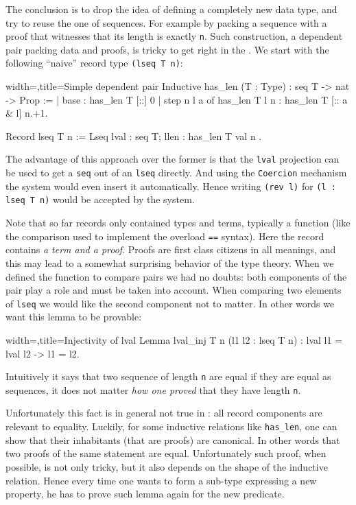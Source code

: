 The conclusion is to drop the idea of defining a completely new data
type, and try to reuse the one of sequences.  For example by packing a
sequence with a proof that witnesses that its length is exactly
\lstinline/n/.  Such construction, a dependent pair packing data
and proofs, is tricky to get right in the \mcbCIC{}.  We start with
the following ``naive'' record type \lstinline/(lseq T n)/:

\begin{coq}{width=\textwidth,title=Simple dependent pair}
Inductive has_len (T : Type) : seq T -> nat -> Prop :=
| base : has_len T [::] 0
| step n l a of has_len T l n : has_len T [:: a & l] n.+1.

Record lseq T n := Lseq { lval : seq T; llen : has_len T val n }.
\end{coq}

The advantage of this approach over the former is that the
\lstinline/lval/ projection can be used to get a \lstinline/seq/ out
of an \lstinline/lseq/ directly.  And using the \lstinline/Coercion/
mechanism the system would even insert it automatically.  Hence
writing \lstinline/(rev l)/ for \lstinline/(l : lseq T n)/ would
be accepted by the system.

Note that so far records only contained types and terms, typically
a function (like the comparison used to implement the overload
\lstinline/==/ syntax).  Here the record contains \emph{a term and a proof}.
Proofs are first class citizens in all meanings, and this may lead to
a somewhat surprising behavior of the type theory.
When we defined the function to compare pairs we had no
doubts: both components of the pair play a role and must be taken into
account.  When comparing two elements of \lstinline/lseq/ we would
like the second component not to matter.  In other words we want this
lemma to be provable:

\begin{coq}{width=\textwidth,title=Injectivity of lval}
Lemma lval_inj T n (l1 l2 : lseq T n) : lval l1 = lval l2 -> l1 = l2.
\end{coq}

Intuitively it says that two sequence of length \lstinline/n/ are
equal if they are equal as sequences, it does not matter \emph{how one
proved} that they have length \lstinline/n/.

Unfortunately this fact is in general not true in \mcbCIC{}: all
record components are relevant to equality.
Luckily, for some inductive relations like \lstinline/has_len/, one
can show that their inhabitants (that are proofs) are canonical.  In
other words that two proofs of the same statement are equal.
Unfortunately such proof, when possible, is not only tricky, but
it also depends on the shape of the inductive relation.  Hence every
time one wants to form a sub-type expressing a new property, he has to
prove such lemma again for the new predicate.

